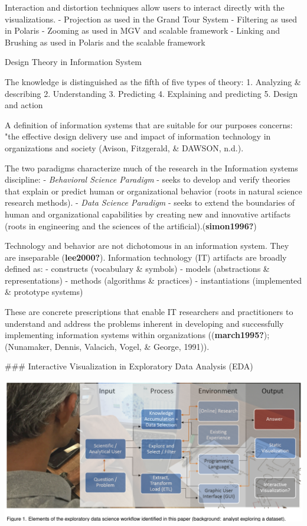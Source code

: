 \documentclass[print]{nuthesis}
\begin{document}
Interaction and distortion techniques allow users to interact directly with the visualizations.
- Projection as used in the Grand Tour System
- Filtering as used in Polaris
- Zooming as used in MGV and scalable framework
- Linking and Brushing as used in Polaris and the scalable framework

Design Theory in Information System

The knowledge is distinguished as the fifth of five types of theory:
1. Analyzing \& describing
2. Understanding
3. Predicting
4. Explaining and predicting
5. Design and action

A definition of information systems that are suitable for our purposes concerns: "the effective design delivery use and impact of information technology in organizations and society (Avison, Fitzgerald, \& DAWSON, n.d.).

The two paradigms characterize much of the research in the Information systems discipline:
- \emph{Behavioral Science Paradigm} - seeks to develop and verify theories that explain or predict human or organizational behavior (roots in natural science research methods).
- \emph{Data Science Paradigm} - seeks to extend the boundaries of human and organizational capabilities by creating new and innovative artifacts (roots in engineering and the sciences of the artificial).(\textbf{simon1996?})

Technology and behavior are not dichotomous in an information system. They are inseparable (\textbf{lee2000?}). Information technology (IT) artifacts are broadly defined as:
- constructs (vocabulary \& symbols)
- models (abstractions \& representations)
- methods (algorithms \& practices)
- instantiations (implemented \& prototype systems)

These are concrete prescriptions that enable IT researchers and practitioners to understand and address the problems inherent in developing and successfully implementing information systems within organizations ((\textbf{march1995?}); (Nunamaker, Dennis, Valacich, Vogel, \& George, 1991)).

\#\#\# Interactive Visualization in Exploratory Data Analysis (EDA)

\begin{center}
\includegraphics[width=\textwidth]{figure/EDAWorkflowElements}
\end{center}
\end{document}
